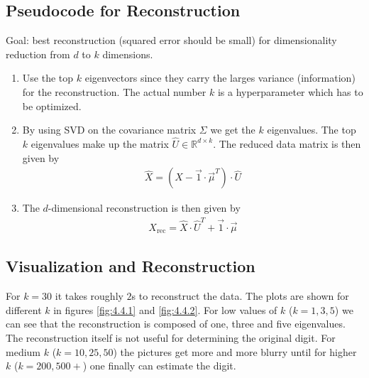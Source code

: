 \documentclass[12pt]{article}
\begin{document}
\subsection{Pseudocode for Reconstruction}

Goal: best reconstruction (squared error should be small) for dimensionality reduction from $d$ to $k$ dimensions.
\begin{enumerate}
	\item Use the top $k$ eigenvectors since they carry the larges variance (information) for the reconstruction. The actual number $k$ is a hyperparameter which has to be optimized.
	\item By using SVD on the covariance matrix $\Sigma$ we get the $k$ eigenvalues. The top $k$ eigenvalues make up the matrix $\hat{U}\in \mathbb{R}^{d \times k}$. The reduced data matrix is then given by
	\begin{align}
	\hat{X} = \left( X - \vec{1}\cdot \vec{\mu}^T \right)\cdot \hat{U} 
	\end{align}
	\item The $d$-dimensional reconstruction is then given by
	\begin{align}
	X_\text{rec} = \hat{X}\cdot \hat{U}^T + \vec{1}\cdot\vec{\mu}
	\end{align}
\end{enumerate}

\subsection{Visualization and Reconstruction}

For $k=30$ it takes roughly $2$s to reconstruct the data. The plots are shown for different $k$ in figures \ref{fig:4.4.1} and \ref{fig:4.4.2}. For low values of $k$ ($k=1,3,5$) we can see that the reconstruction is composed of one, three and five eigenvalues. The reconstruction itself is not useful for determining the original digit. For medium $k$ ($k=10,25,50$) the pictures get more and more blurry until for higher $k$ ($k=200,500+$) one finally can estimate the digit.
\end{document}
